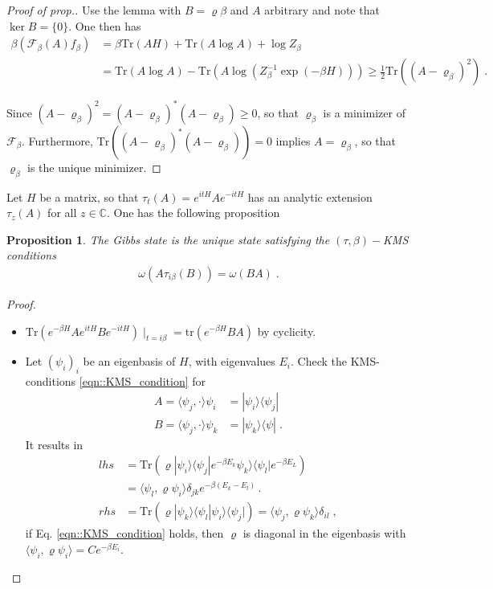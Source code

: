 \documentclass[
a4paper, %
11pt, %
onecolumn, %
openany, %
]{memoir}
\theoremstyle{definition}
\theoremstyle{remark}
\theoremstyle{plain}
\newtheorem{prop}{Proposition}[chapter]
\begin{document}
\begin{proof}[Proof of prop.]
	Use the lemma with $B=\varrho\beta$ and $A$ arbitrary and note that $\ker B=\{0\}$. One then has \begin{align}
	\beta(\mathcal{F}_{\beta}(A)f_{\beta})&=\beta \mathrm{Tr}(AH)+\mathrm{Tr}(A\log A)+\log Z_{\beta}\\
	&=\mathrm{Tr}(A\log A)-\mathrm{Tr}(A\log (Z_{\beta}^{-1}\exp(-\beta H)))\geq \frac{1}{2} \mathrm{Tr}((A-\varrho_{\beta})^2)\; .
	\end{align}

Since $(A-\varrho_{\beta})^2=(A-\varrho_{\beta})^*(A-\varrho_{\beta})\geq 0$, so that $\varrho_{\beta}$ is a minimizer of $\mathcal{F}_{\beta}$. Furthermore, $\mathrm{Tr}((A-\varrho_{\beta})^*(A-\varrho_{\beta}))=0$ implies $A=\varrho_{\beta}$, so that $\varrho_{\beta}$ is the unique minimizer.\end{proof}
Let $H$ be a matrix, so that $\tau_t(A)=e^{itH}Ae^{-itH}$ has an analytic extension $\tau_z(A)$ for all $z\in\mathbb{C}$. One has the following proposition \begin{prop}
	The Gibbs state is the unique state satisfying the $(\tau,\beta)-$KMS conditions \begin{align}
	\omega(A\tau_{i\beta}(B))=\omega(BA) \label{eqn::KMS_condition}\; .
	\end{align}
\end{prop}
\begin{proof}
	\begin{itemize}
		\item $\mathrm{Tr}(e^{-\beta H}Ae^{itH}Be^{-itH})\mid_{t=i\beta}=\mathrm{tr}(e^{-\beta H}BA)$ by cyclicity.
		\item Let $(\psi_i)_i$ be an eigenbasis of $H$, with eigenvalues $E_i$. Check the KMS-conditions \eqref{eqn::KMS_condition} for\begin{align}
		A=\langle \psi_j,\cdot\rangle\psi_i&=|\psi_i\rangle\langle\psi_j|\\
		B=\langle\psi_j,\cdot\rangle\psi_k&=|\psi_k\rangle\langle\psi| \; .
		\end{align}
		It results in \begin{align}
		lhs &= \mathrm{Tr}(\varrho|\psi_i\rangle\langle\psi_j|e^{-\beta E_k}\psi_k\rangle\langle\psi_l|e^{-\beta E_L})\\
		&= \langle \psi_l,\varrho\psi_i\rangle \delta_{jk}e^{-\beta(E_k-E_l)}\,.\\
		rhs&= \mathrm{Tr}(\varrho|\psi_k\rangle\langle\psi_l|\psi_i\rangle\langle\psi_j|)=\langle\psi_j,\varrho\psi_k\rangle\delta_{il}\;,
		\end{align}
		if Eq. \eqref{eqn::KMS_condition} holds, then $\varrho$ is diagonal in the eigenbasis with $\langle \psi_i,\varrho\psi_i\rangle = Ce^{-\beta E_i}$.
	\end{itemize}
\end{proof}
\end{document}
